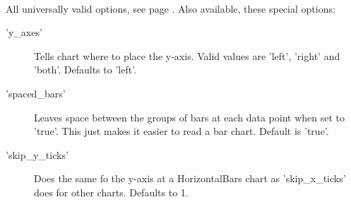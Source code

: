 \Methods
{}\\[\parabstand]
%
\Attributes
All universally valid options, see page \pageref{options}. Also available, these special options:
\begin{description}
\item['y\_axes'] Tells chart where to place the y-axis. 
      Valid values are 'left', 'right' and 'both'. Defaults to 'left'.

\item['spaced\_bars'] Leaves space between the groups of bars 
     at each data point when set to 'true'.  
     This just makes it easier to read a bar chart.  Default is 'true'.

\item['skip\_y\_ticks'] 
     Does the same fo the y-axis at a HorizontalBars chart as 'skip\_x\_ticks' 
     does for other charts. Defaults to 1.
\end{description}
